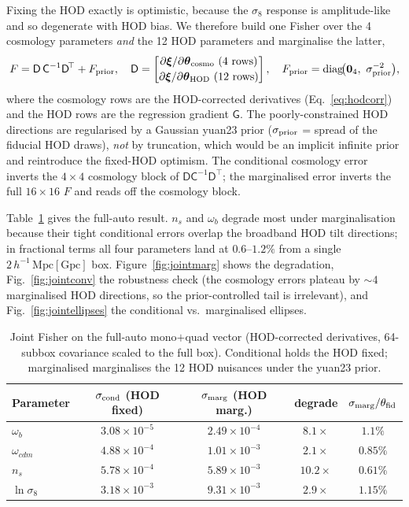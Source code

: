 \documentclass[11pt]{article}
\newcommand{\Mpch}{\,h^{-1}\,\mathrm{Mpc}}
\newcommand{\xivec}{\boldsymbol{\xi}}
\begin{document}
Fixing the HOD exactly is optimistic, because the $\sigma_8$ response is
amplitude-like and so degenerate with HOD bias.  We therefore build one
Fisher over the 4 cosmology parameters \emph{and} the 12 HOD parameters and
marginalise the latter,
\begin{equation}
F = \mathsf{D}\,\mathsf{C}^{-1}\mathsf{D}^{\!\top} + F_{\rm prior},
\quad
\mathsf{D}=
\begin{bmatrix}
\partial\xivec/\partial\boldsymbol{\theta}_{\rm cosmo}\ (4\ \text{rows})\\[2pt]
\partial\xivec/\partial\boldsymbol{\theta}_{\rm HOD}\ (12\ \text{rows})
\end{bmatrix},
\quad
F_{\rm prior}=\mathrm{diag}\!\big(\mathbf{0}_4,\ \sigma_{\rm prior}^{-2}\big),
\label{eq:joint}
\end{equation}
where the cosmology rows are the HOD-corrected derivatives
(Eq.~\ref{eq:hodcorr}) and the HOD rows are the regression gradient
$\mathsf{G}$.  The poorly-constrained HOD directions are regularised by a
Gaussian yuan23 prior ($\sigma_{\rm prior}$ = spread of the fiducial HOD
draws), \emph{not} by truncation, which would be an implicit infinite prior
and reintroduce the fixed-HOD optimism.  The conditional cosmology error
inverts the $4\times4$ cosmology block of $\mathsf{D}\mathsf{C}^{-1}
\mathsf{D}^\top$; the marginalised error inverts the full $16\times16$
$F$ and reads off the cosmology block.

Table~\ref{tab:joint} gives the full-auto result.  $n_s$ and $\omega_b$
degrade most under marginalisation because their tight conditional errors
overlap the broadband HOD tilt directions; in fractional terms all four
parameters land at $0.6$--$1.2\%$ from a single $2\Mpch[\mathrm{Gpc}]$ box.
Figure~\ref{fig:jointmarg} shows the degradation, Fig.~\ref{fig:jointconv}
the robustness check (the cosmology errors plateau by $\sim4$ marginalised
HOD directions, so the prior-controlled tail is irrelevant), and
Fig.~\ref{fig:jointellipses} the conditional vs.\ marginalised ellipses.

\begin{table}[ht]
\centering
\begin{tabular}{lcccc}
\toprule
Parameter & $\sigma_{\rm cond}$ (HOD fixed) & $\sigma_{\rm marg}$ (HOD marg.) & degrade & $\sigma_{\rm marg}/\theta_{\rm fid}$ \\
\midrule
$\omega_b$      & $3.08\times10^{-5}$ & $2.49\times10^{-4}$ & $8.1\times$  & $1.1\%$  \\
$\omega_{cdm}$  & $4.88\times10^{-4}$ & $1.01\times10^{-3}$ & $2.1\times$  & $0.85\%$ \\
$n_s$           & $5.78\times10^{-4}$ & $5.89\times10^{-3}$ & $10.2\times$ & $0.61\%$ \\
$\ln\sigma_8$   & $3.18\times10^{-3}$ & $9.31\times10^{-3}$ & $2.9\times$  & $1.15\%$ \\
\bottomrule
\end{tabular}
\caption{Joint Fisher on the full-auto mono$+$quad vector (HOD-corrected
derivatives, 64-subbox covariance scaled to the full box).  Conditional
holds the HOD fixed; marginalised marginalises the 12 HOD nuisances under
the yuan23 prior.}
\label{tab:joint}
\end{table}
\end{document}
